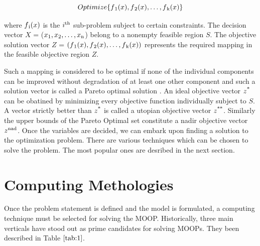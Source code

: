 \documentclass[conference]{IEEEtran}
\begin{document}
\begin{equation}
Optimize \{f\textsubscript{1}(x), f\textsubscript{2}(x), \dots, f\textsubscript{k}(x)\}
\end{equation}

where $f\textsubscript{i}(x)$ is the $i\textsuperscript{th}$ sub-problem subject to certain constraints. The decision vector $X$ = ($x\textsubscript{1}, x\textsubscript{2}, \dots, x\textsubscript{n}$) belong to a nonempty feasible region $S$. The objective solution vector $Z$ =  $(f\textsubscript{1}(x), f\textsubscript{2}(x), \dots, f\textsubscript{k}(x))$ represents the required mapping in the feasible objective region $Z$. 

Such a mapping is considered to be optimal if none of the individual components can be improved without degradation of at least one other component and such a solution vector is called a Pareto optimal solution \cite{pare}. An ideal objective vector $z\textsuperscript{*}$ can be obatined by minimizing every objective function individually subject to $S$. A vector strictly better than $z\textsuperscript{*}$ is called a utopian objective vector $z\textsuperscript{**}$. Similarly the upper bounds of the Pareto Optimal set constitute a nadir objective vector $z\textsuperscript{nad}$. Once the variables are decided, we can embark upon finding a solution to the optimization problem. There are various techniques which can be chosen to solve the problem. The most popular ones are desribed in the next section. 

\section{Computing Methologies}

Once the problem statement is defined and the model is formulated, a computing technique must be selected for solving the MOOP. Historically, three main verticals have stood out as prime candidates for solving MOOPs. They been described in Table $\ref{tab:1}$. 
\end{document}
